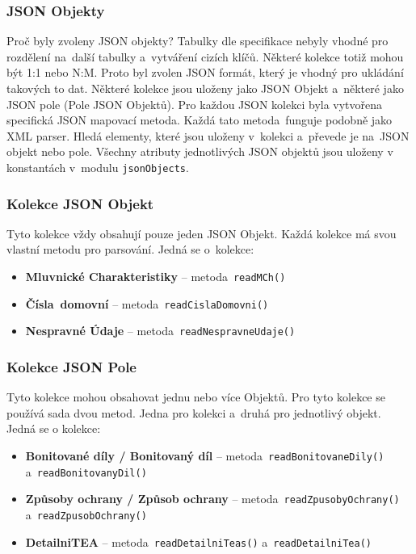 \subsubsection*{JSON Objekty}
Proč byly zvoleny JSON objekty? Tabulky dle specifikace nebyly vhodné pro rozdělení na~další tabulky a~vytváření cizích klíčů.
Některé kolekce totiž mohou být 1:1 nebo N:M. Proto byl zvolen JSON formát, který je vhodný pro ukládání takových to dat.
Některé kolekce jsou uloženy jako JSON Objekt a~některé jako JSON pole (Pole JSON Objektů).
Pro každou JSON kolekci byla vytvořena specifická JSON mapovací metoda. Každá tato metoda~funguje podobně jako XML parser.
Hledá elementy, které jsou uloženy v~kolekci a~převede je na~JSON objekt nebo pole.
Všechny atributy jednotlivých JSON objektů jsou uloženy v konstantách v~modulu \texttt{jsonObjects}. 

\subsubsection*{Kolekce JSON Objekt}
Tyto kolekce vždy obsahují pouze jeden JSON Objekt.
Každá kolekce má svou vlastní metodu pro parsování.
Jedná se o~kolekce:
\begin{itemize}
    \item \textbf{Mluvnické Charakteristiky} -- metoda~\texttt{readMCh()}
    \item \textbf{Čísla~domovní} -- metoda~\texttt{readCislaDomovni()}
    \item \textbf{Nespravné Údaje} -- metoda~\texttt{readNespravneUdaje()}
\end{itemize}

\subsubsection*{Kolekce JSON Pole}
Tyto kolekce mohou obsahovat jednu nebo více Objektů.
Pro tyto kolekce se používá sada dvou metod. Jedna pro kolekci a~druhá pro jednotlivý objekt. 
Jedná se o kolekce:
\begin{itemize}
    \item \textbf{Bonitované díly / Bonitovaný díl} -- metoda~\texttt{readBonitovaneDily()} a~\texttt{readBonitovanyDil()}
    \item \textbf{Způsoby ochrany / Způsob ochrany} -- metoda~\texttt{readZpusobyOchrany()} a~\texttt{readZpusobOchrany()}
    \item \textbf{DetailniTEA} -- metoda~\texttt{readDetailniTeas()} a~\texttt{readDetailniTea()}
\end{itemize}

